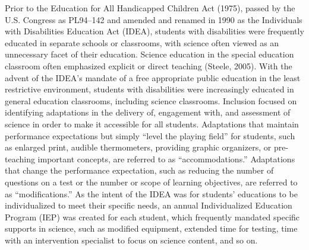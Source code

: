 \documentclass[11.5pt]{sig-alternate} %
\begin{document}
\begin{large}
Prior to the Education for All Handicapped Children Act (1975), passed by the U.S. Congress as PL94–142 and amended and renamed in 1990 as the Individuals with Disabilities Education Act (IDEA), students with disabilities were frequently educated in separate schools or classrooms, with science often viewed as an unnecessary facet of their education.  Science education in the special education classroom often emphasized explicit or direct teaching (Steele, 2005). With the advent of the IDEA’s mandate of a free appropriate public education in the least restrictive environment, students with disabilities were increasingly educated in general education classrooms, including science classrooms.  Inclusion focused on identifying adaptations in the delivery of, engagement with, and assessment of science in order to make it accessible for all students.  Adaptations that maintain performance expectations but simply “level the playing field” for students, such as enlarged print, audible thermometers, providing graphic organizers, or pre-teaching important concepts, are referred to as “accommodations.”  Adaptations that change the performance expectation, such as reducing the number of questions on a test or the number or scope of learning objectives, are referred to as “modifications.”  As the intent of the IDEA was for students’ educations to be individualized to meet their specific needs, an annual Individualized Education Program (IEP) was created for each student, which frequently mandated specific supports in science, such as modified equipment, extended time for testing, time with an intervention specialist to focus on science content, and so on.


\end{large}
\end{document}
